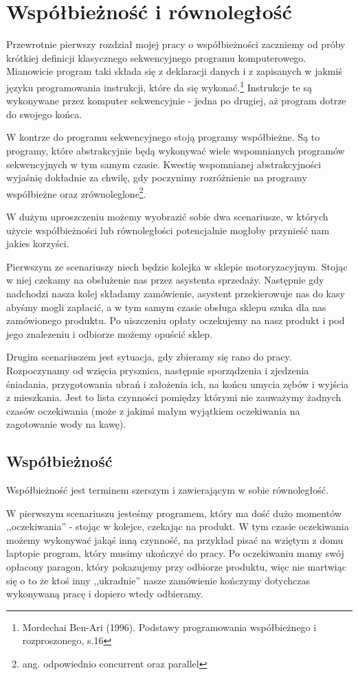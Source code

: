 \chapter{Współbieżność i równoległość}

Przewrotnie pierwszy rozdział mojej pracy o współbieżności zaczniemy od próby krótkiej definicji klasycznego sekwencyjnego programu komputerowego. Mianowicie program taki składa się z deklaracji danych i z zapisanych w jakmiś języku programowania instrukcji, które da się wykonać.\footnote{Mordechai Ben-Ari (1996). Podstawy programowania współbieżnego i rozproszonego, s.16} Instrukcje te są wykonywane przez komputer sekwencyjnie - jedna po drugiej, aż program dotrze do swojego końca.

W kontrze do programu sekwencyjnego stoją programy współbieżne. Są to programy, które abstrakcyjnie będą wykonywać wiele wspomnianych programów sekwencyjnych w tym samym czasie. Kwestię wspomnianej abstrakcyjności wyjaśnię dokładnie za chwilę, gdy poczynimy rozróżnienie na programy współbieżne oraz zrównoleglone\footnote{ang. odpowiednio concurrent oraz parallel}.

W dużym uproszczeniu możemy wyobrazić sobie dwa scenariusze, w których użycie współbieżności lub równoległości potencjalnie mogłoby przynieść nam jakies korzyści.

Pierwszym ze scenariuszy niech będzie kolejka w sklepie motoryzacyjnym. Stojąc w niej czekamy na obsłużenie nas przez asystenta sprzedaży. Następnie gdy nadchodzi nasza kolej składamy zamówienie, asystent przekierowuje nas do kasy abyśmy mogli zapłacić, a w tym samym czasie obsługa sklepu szuka dla nas zamówionego produktu. Po uiszczeniu opłaty oczekujemy na nasz produkt i pod jego znalezeniu i odbiorze możemy opuścić sklep.

Drugim scenariuszem jest sytuacja, gdy zbieramy się rano do pracy. Rozpoczynamy od wzięcia prysznica, następnie sporządzenia i zjedzenia śniadania, przygotowania ubrań i założenia ich, na końcu umycia zębów i wyjścia z mieszkania. Jest to lista czynności pomiędzy którymi nie zauważymy żadnych czasów oczekiwania (może z jakimś małym wyjątkiem oczekiwania na zagotowanie wody na kawę).

\section{Współbieżność}
Współbieżność jest terminem szerszym i zawierającym w sobie równoległość. 

W pierwszym scenariuszu jesteśmy programem, który ma dość dużo momentów ,,oczekiwania'' - stojąc w kolejce, czekając na produkt. W tym czasie oczekiwania możemy wykonywać jakąś inną czynność, na przykład pisać na wziętym z domu laptopie program, który musimy ukończyć do pracy. Po oczekiwaniu mamy swój opłacony paragon, który pokazujemy przy odbiorze produktu, więc nie martwiąc się o to że ktoś inny ,,ukradnie'' nasze zamówienie kończymy dotychczas wykonywaną pracę i dopiero wtedy odbieramy.

